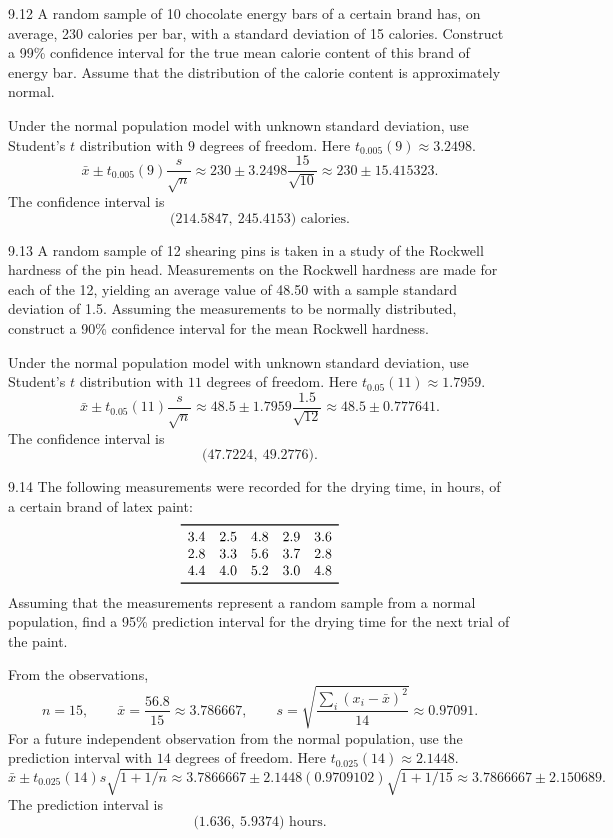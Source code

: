 \documentclass[11pt,oneside]{article}
\begin{document}
\begin{exercise}{9.12}
A random sample of 10 chocolate energy bars of a certain brand has, on average, 230 calories per bar, with a standard deviation of 15 calories. Construct a 99\% confidence interval for the true mean calorie content of this brand of energy bar. Assume that the distribution of the calorie content is approximately normal.
\end{exercise}
\begin{solution}
Under the normal population model with unknown standard deviation, use Student's $t$ distribution with $9$ degrees of freedom. Here $t_{0.005}(9)\approx 3.2498$.
\[
\bar x\pm t_{0.005}(9)\frac{s}{\sqrt n}\approx 230\pm 3.2498\frac{15}{\sqrt{10}}\approx 230\pm 15.415323.
\]
The confidence interval is 
\[
\boxed{\bigl(214.5847,\ 245.4153\bigr)}\text{ calories}.
\]
\end{solution}

\begin{exercise}{9.13}
A random sample of 12 shearing pins is taken in a study of the Rockwell hardness of the pin head. Measurements on the Rockwell hardness are made for each of the 12, yielding an average value of 48.50 with a sample standard deviation of 1.5. Assuming the measurements to be normally distributed, construct a 90\% confidence interval for the mean Rockwell hardness.
\end{exercise}
\begin{solution}
Under the normal population model with unknown standard deviation, use Student's $t$ distribution with $11$ degrees of freedom. Here $t_{0.05}(11)\approx 1.7959$.
\[
\bar x\pm t_{0.05}(11)\frac{s}{\sqrt n}\approx 48.5\pm 1.7959\frac{1.5}{\sqrt{12}}\approx 48.5\pm 0.777641.
\]
The confidence interval is 
\[
\boxed{\bigl(47.7224,\ 49.2776\bigr)}.
\]
\end{solution}

\begin{exercise}{9.14}
The following measurements were recorded for the drying time, in hours, of a certain brand of latex paint:
\[
\begin{array}{ccccc}\toprule
3.4 & 2.5 & 4.8 & 2.9 & 3.6\\
2.8 & 3.3 & 5.6 & 3.7 & 2.8\\
4.4 & 4.0 & 5.2 & 3.0 & 4.8\\
\bottomrule\end{array}
\]
Assuming that the measurements represent a random sample from a normal population, find a 95\% prediction interval for the drying time for the next trial of the paint.
\end{exercise}
\begin{solution}
From the observations, 
\[
n=15,\qquad\bar x=\frac{56.8}{15}\approx3.786667,\qquad s=\sqrt{\frac{\sum_i(x_i-\bar x)^2}{14}}\approx0.97091.
\]
For a future independent observation from the normal population, use the prediction interval with $14$ degrees of freedom. Here $t_{0.025}(14)\approx 2.1448$.
\[
\bar x\pm t_{0.025}(14)s\sqrt{1+1/n}\approx 3.7866667\pm 2.1448(0.9709102)\sqrt{1+1/15}\approx 3.7866667\pm 2.150689.
\]
The prediction interval is 
\[
\boxed{\bigl(1.636,\ 5.9374\bigr)}\text{ hours}.
\]
\end{solution}
\end{document}
